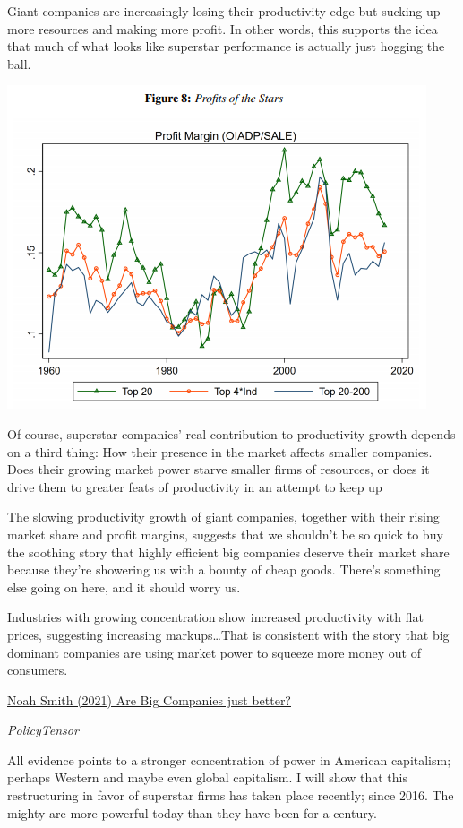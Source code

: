 \documentclass[
]{book}
\begin{document}
Giant companies are increasingly losing their productivity edge but sucking up more resources and making more profit. In other words, this supports the idea that much of what looks like superstar performance is actually just hogging the ball.

\includegraphics{fig/superstars_profit.png}

Of course, superstar companies' real contribution to productivity growth depends on a third thing: How their presence in the market affects smaller companies. Does their growing market power starve smaller firms of resources, or does it drive them to greater feats of productivity in an attempt to keep up

The slowing productivity growth of giant companies, together with their rising market share and profit margins, suggests that we shouldn't be so quick to buy the soothing story that highly efficient big companies deserve their market share because they're showering us with a bounty of cheap goods. There's something else going on here, and it should worry us.

Industries with growing concentration show increased productivity with flat prices, suggesting increasing markups\ldots That is consistent with the story that big dominant companies are using market power to squeeze more money out of consumers.

\href{https://noahpinion.substack.com/p/are-big-companies-just-better}{Noah Smith (2021) Are Big Companies just better?}

\emph{PolicyTensor}

All evidence points to a stronger concentration of power in American capitalism; perhaps
Western and maybe even global capitalism. I will show that this restructuring in favor of superstar firms has taken place recently; since 2016. The mighty are more powerful today than they have been for a century.
\end{document}
